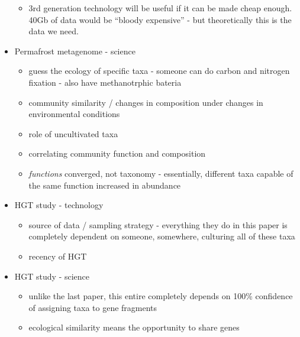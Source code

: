 \documentclass{article}
\begin{document}
\begin{itemize}
\begin{itemize}
            \item 3rd generation technology will be useful if it can be made cheap enough.  40Gb of data would be ``bloody expensive'' - but theoretically this is the data we need.
        \end{itemize}
        \item Permafrost metagenome - science
        \begin{itemize}
            \item guess the ecology of specific taxa - someone can do carbon and nitrogen fixation - also have methanotrphic bateria
            \item community similarity / changes in composition under changes in environmental conditions
            \item role of uncultivated taxa
            \item correlating community function and composition
            \item \emph{functions} converged, not taxonomy - essentially, different taxa capable of the same function increased in abundance
        \end{itemize}
        \item HGT study - technology
        \begin{itemize}
            \item source of data / sampling strategy - everything they do in this paper is completely dependent on someone, somewhere, culturing all of these taxa
            \item recency of HGT
        \end{itemize}
        \item HGT study - science
        \begin{itemize}
            \item unlike the last paper, this entire completely depends on 100\% confidence of assigning taxa to gene fragments
            \item ecological similarity means the opportunity to share genes
        \end{itemize}
    \end{itemize}
\end{document}
